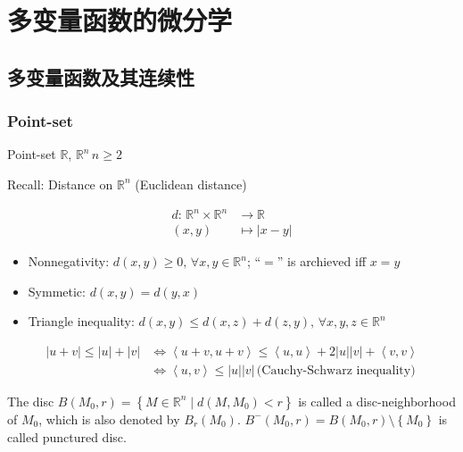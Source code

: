 \section{多变量函数的微分学}

\subsection{多变量函数及其连续性}
\subsubsection[平面上的点集]{Point-set}

Point-set $\mathbb{R}$, $\mathbb{R}^n\,n\geq 2$

Recall: Distance on $\mathbb{R}^n$ (Euclidean distance)

\begin{align*}
    d:\,\mathbb{R}^n\times\mathbb{R}^n & \to\mathbb{R}           \\
    (x,y)                              & \mapsto\left|x-y\right|
\end{align*}

\begin{itemize}
    \item Nonnegativity: $d(x,y)\geq 0,\,\forall x,y\in\mathbb{R}^n$; ``$=$'' is archieved iff $x=y$
    \item Symmetic: $d(x,y)=d(y,x)$
    \item Triangle inequality: $d(x,y)\leq d(x,z)+d(z,y),\,\forall x,y,z\in\mathbb{R}^n$
\end{itemize}

\emph{\begin{align*}
        \left|u+v\right|\leq\left|u\right|+\left|v\right| & \iff\left<u+v,u+v\right>\leq \left<u,u\right>+2\left|u\right|\left|v\right|+\left<v,v\right> \\
                                                          & \iff\left<u,v\right>\leq\left|u\right|\left|v\right|\,\text{(Cauchy-Schwarz inequality)}
    \end{align*}}

\begin{definition}
    The disc $B\left(M_0,r\right)=\left\{M\in\mathbb{R}^n\mid d\left(M,M_0\right)<r\right\}$ is called a disc-neighborhood of $M_0$, which is also denoted by $B_r\left(M_0\right)$. $B^-\left(M_0,r\right)=B\left(M_0,r\right)\setminus\left\{M_0\right\}$ is called punctured disc.
\end{definition}

